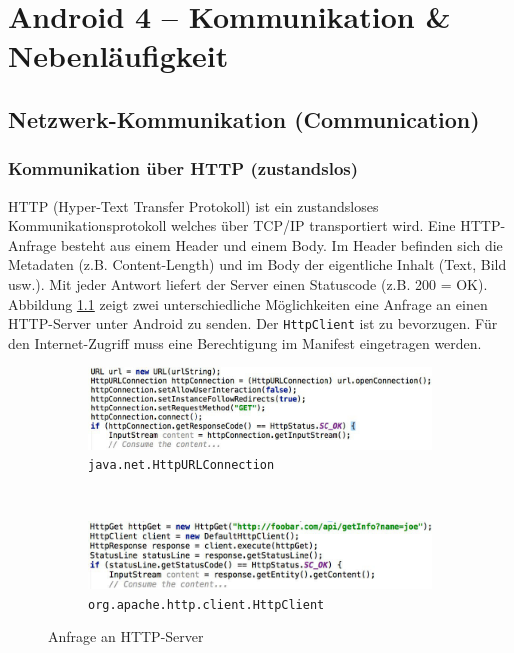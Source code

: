 \chapter{Android 4 – Kommunikation \& Nebenläufigkeit}

\section{Netzwerk-Kommunikation (Communication)}

\subsection{Kommunikation über HTTP (zustandslos)}

HTTP (Hyper-Text Transfer Protokoll) ist ein zustandsloses Kommunikationsprotokoll welches über TCP/IP transportiert wird. Eine HTTP-Anfrage besteht aus einem Header und einem Body. Im Header befinden sich die Metadaten (z.B. Content-Length) und im Body der eigentliche Inhalt (Text, Bild usw.). Mit jeder Antwort liefert der Server einen Statuscode (z.B. 200 = OK).
Abbildung \ref{fig:http-anfrage} zeigt zwei unterschiedliche Möglichkeiten eine Anfrage an einen HTTP-Server unter Android zu senden. Der \texttt{HttpClient} ist zu bevorzugen. Für den Internet-Zugriff muss eine Berechtigung im Manifest eingetragen werden.

\begin{figure}
	\centering
	\begin{subfigure}[b]{0.48\textwidth}
		\includegraphics[width=\textwidth]{fig/httpurlconnection}
		\caption{\texttt{java.net.HttpURLConnection}}
	\end{subfigure}
	~
	\begin{subfigure}[b]{0.48\textwidth}
		\includegraphics[width=\textwidth]{fig/httpclient}
		\caption{\texttt{org.apache.http.client.HttpClient}}
	\end{subfigure}
	\caption{Anfrage an HTTP-Server}
	\label{fig:http-anfrage}
\end{figure}

